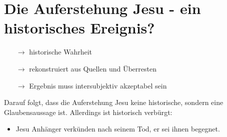 \documentclass[12pt,a4paper]{report}
\begin{document}
	\section{Die Auferstehung Jesu - ein historisches Ereignis?}
	\begin{itemize}
		\item[$\to$] historische \dq Wahrheit\dq
		\item[$\to$] rekonstruiert aus Quellen und Überresten
		\item[$\to$] Ergebnis muss intersubjektiv akzeptabel sein
	\end{itemize}
	Darauf folgt, dass die Auferstehung Jesu keine historische, sondern eine Glaubensaussage ist.
	Allerdings ist historisch verbürgt:
	\begin{itemize}
		\item Jesu Anhänger verkünden nach seinem Tod, er sei ihnen begegnet.
	\end{itemize}
\end{document}
